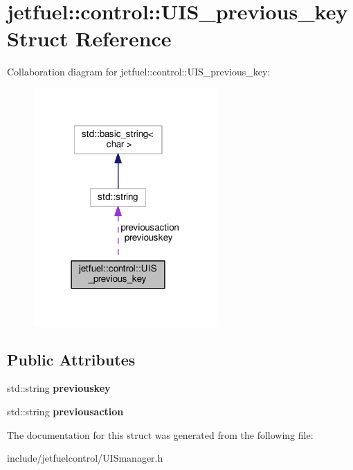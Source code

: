 \hypertarget{structjetfuel_1_1control_1_1UIS__previous__key}{}\section{jetfuel\+:\+:control\+:\+:U\+I\+S\+\_\+previous\+\_\+key Struct Reference}
\label{structjetfuel_1_1control_1_1UIS__previous__key}


Collaboration diagram for jetfuel\+:\+:control\+:\+:U\+I\+S\+\_\+previous\+\_\+key\+:
\nopagebreak
\begin{figure}[H]
\begin{center}
\leavevmode
\includegraphics[width=198pt]{structjetfuel_1_1control_1_1UIS__previous__key__coll__graph}
\end{center}
\end{figure}
\subsection*{Public Attributes}
\begin{DoxyCompactItemize}
\item 
\mbox{\label{structjetfuel_1_1control_1_1UIS__previous__key_a9cc6e0c22eee2446599cbe475c81ee03}} 
std\+::string {\bfseries previouskey}
\item 
\mbox{\label{structjetfuel_1_1control_1_1UIS__previous__key_a89689b08b374da05359b8c667bf0dec9}} 
std\+::string {\bfseries previousaction}
\end{DoxyCompactItemize}


The documentation for this struct was generated from the following file\+:\begin{DoxyCompactItemize}
\item 
include/jetfuelcontrol/U\+I\+Smanager.\+h\end{DoxyCompactItemize}
